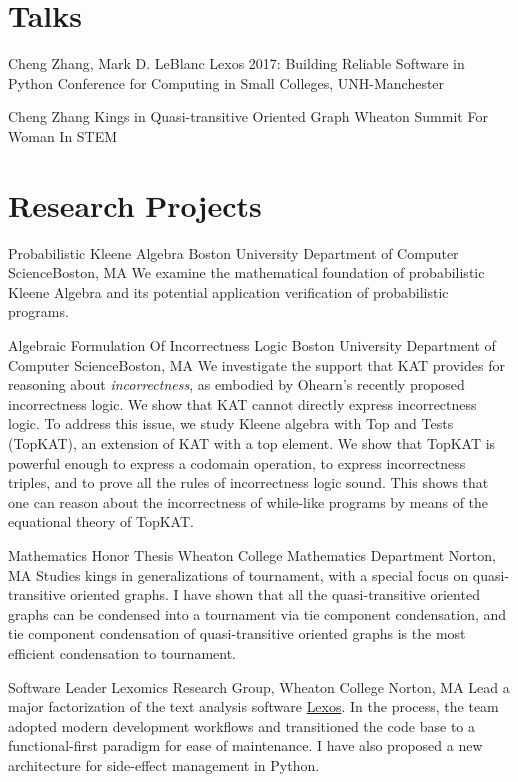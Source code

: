 \documentclass[11pt,roman]{moderncv}        %
\begin{document}
\section{Talks}

{Cheng Zhang, Mark D. LeBlanc}
{Lexos 2017: Building Reliable Software in Python}
{Conference for Computing in Small Colleges, UNH-Manchester}
{}{}

{Cheng Zhang}
{Kings in Quasi-transitive Oriented Graph}
{Wheaton Summit For Woman In STEM}
{}{}


\section{Research Projects}

{Probabilistic Kleene Algebra}
{Boston University Department of Computer Science}{Boston, MA}{}
{We examine the mathematical foundation of probabilistic Kleene Algebra 
and its potential application verification of probabilistic programs.}

{Algebraic Formulation Of Incorrectness Logic}
{Boston University Department of Computer Science}{Boston, MA}{}
{We investigate the support that KAT provides for reasoning about \emph{incorrectness}, 
as embodied by Ohearn's recently proposed incorrectness logic. 
We show that KAT cannot directly express incorrectness logic. 
To address this issue, we study Kleene algebra with Top and Tests (TopKAT), 
an extension of KAT with a top element. 
We show that TopKAT is powerful enough to express a codomain operation, 
to express incorrectness triples, 
and to prove all the rules of incorrectness logic sound. 
This shows that one can reason about the incorrectness of while-like programs 
by means of the equational theory of TopKAT\@. }

{Mathematics Honor Thesis}
{Wheaton College Mathematics Department}
{Norton, MA}{}
{Studies kings in generalizations of tournament,
with a special focus on quasi-transitive oriented graphs.
I have shown that all the quasi-transitive oriented graphs
can be condensed into a tournament via tie component condensation, 
and tie component condensation of quasi-transitive 
oriented graphs is the most efficient condensation to tournament.
}

{Software Leader}
{Lexomics Research Group, Wheaton College}
{Norton, MA}{}
{
  Lead a major factorization of the text analysis software 
  \href{https://github.com/WheatonCS/Lexos}{Lexos}.
  In the process, the team adopted modern development workflows and
  transitioned the code base to a functional-first paradigm for ease of maintenance.
  I have also proposed a new architecture for 
  side-effect management in Python.
}
\end{document}
